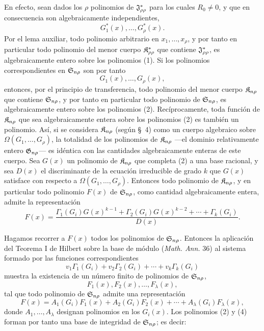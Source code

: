 \documentclass[11pt]{article}
\begin{document}
En efecto, sean dados los $\rho$ polinomios de $\mathfrak{J}^*_{\rho\rho}$ para los cuales $R_0\ne0$, y que en consecuencia son algebraicamente independientes,
\begin{equation}
  G_1^*(x),\ldots,G_\rho^*(x).
\tag{1}
\end{equation}
Por el lema auxiliar, todo polinomio arbitrario en $x_1,\ldots,x_\rho$, y por tanto en particular todo polinomio del menor cuerpo $\mathfrak{K}^*_{\rho\rho}$ que contiene $\mathfrak{J}^*_{\rho\rho}$, es algebraicamente entero sobre los polinomios (1). Si los polinomios correspondientes en $\mathfrak{S}_{n\rho}$ son por tanto
\begin{equation}
  G_1(x),\ldots,G_\rho(x),
\tag{2}
\end{equation}
entonces, por el principio de transferencia, todo polinomio del menor cuerpo $\mathfrak{K}_{n\rho}$ que contiene $\mathfrak{S}_{n\rho}$, y por tanto en particular todo polinomio de $\mathfrak{S}_{n\rho}$, es algebraicamente entero sobre los polinomios (2). Recíprocamente, toda función de $\mathfrak{K}_{n\rho}$ que sea algebraicamente entera sobre los polinomios (2) es también un polinomio. Así, si se considera $\mathfrak{K}_{n\rho}$ (según \S\ 4) como un cuerpo algebraico sobre $\Omega(G_1,\ldots,G_\rho)$, la totalidad de los polinomios de $\mathfrak{K}_{n\rho}$ ---el dominio relativamente entero $\mathfrak{G}_{n\rho}$--- es idéntica con las cantidades algebraicamente enteras de este cuerpo. Sea $G(x)$ un polinomio de $\mathfrak{K}_{n\rho}$ que completa (2) a una base racional, y sea $D(x)$ el discriminante de la ecuación irreducible de grado $k$ que $G(x)$ satisface con respecto a $\Omega(G_1,\ldots,G_\rho)$. Entonces todo polinomio de $\mathfrak{K}_{n\rho}$, y en particular todo polinomio $F(x)$ de $\mathfrak{S}_{n\rho}$, como cantidad algebraicamente entera, admite la representación
\begin{equation}
  F(x)=\frac{\Gamma_1(G_i)G(x)^{k-1}+\Gamma_2(G_i)G(x)^{k-2}+\cdots+\Gamma_k(G_i)}{D(x)}.
\tag{3}
\end{equation}

Hagamos recorrer a $F(x)$ todos los polinomios de $\mathfrak{S}_{n\rho}$. Entonces la aplicación del Teorema I de Hilbert sobre la base de módulo (\emph{Math. Ann.} 36) al sistema formado por las funciones correspondientes
\[
  v_1\Gamma_1(G_i)+v_2\Gamma_2(G_i)+\cdots+v_k\Gamma_k(G_i)
\]
muestra la existencia de un número finito de polinomios de $\mathfrak{S}_{n\rho}$,
\begin{equation}
  F_1(x),F_2(x),\ldots,F_\lambda(x),
\tag{4}
\end{equation}
tal que todo polinomio de $\mathfrak{S}_{n\rho}$ admite una representación
\begin{equation}
  F(x)=A_1(G_i)F_1(x)+A_2(G_i)F_2(x)+\cdots+A_\lambda(G_i)F_\lambda(x),
\tag{5}
\end{equation}
donde $A_1,\ldots,A_\lambda$ designan polinomios en los $G_i(x)$. Los polinomios (2) y (4) forman por tanto una base de integridad de $\mathfrak{S}_{n\rho}$; es decir:
\end{document}
